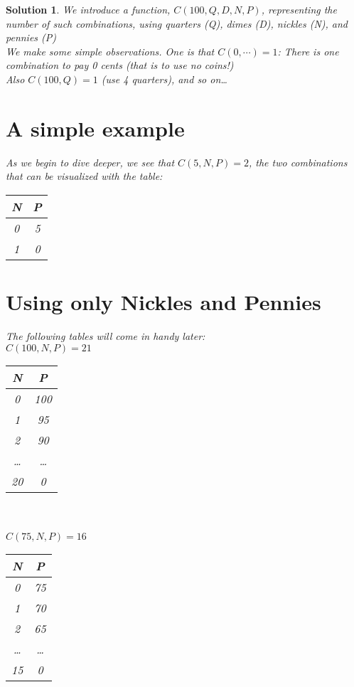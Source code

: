 \documentclass{article}
\newtheorem*{solution*}{Solution}
\begin{document}
\begin{solution*}
We introduce a function, $C(100, Q, D, N, P)$,
representing the number of such combinations,
using quarters (Q), dimes (D), nickles (N), and pennies (P)\\

We make some simple observations. One is that $C(0,\cdots)=1$: 
There is one combination to pay 0 cents (that is to use no coins!)\\

Also $C(100,Q)=1$ (use 4 quarters), and so on\dots\\

\section{A simple example}
As we begin to dive deeper, we see that $C(5, N, P)=2$, the
two combinations that can be visualized with the table:\\

\begin{tabular}{|c|c|}
    \hline
    N & P \\
    \hline
    0 & 5\\
    \hline
    1 & 0\\
    \hline
\end{tabular}

\newpage
\section{Using only Nickles and Pennies}
The following tables will come in handy later:\\

$C(100, N, P)=21$\\
\begin{tabular}{|c|c|}
    \hline
    N & P \\
    \hline
    0 & 100\\
    \hline
    1 & 95\\
    \hline
    2 & 90\\
    \hline
    \dots & \dots\\
    \hline
    20 & 0\\
    \hline
\end{tabular}\\\\

$C(75, N, P)=16$\\
\begin{tabular}{|c|c|}
    \hline
    N & P \\
    \hline
    0 & 75\\
    \hline
    1 & 70\\
    \hline
    2 & 65\\
    \hline
    \dots & \dots\\
    \hline
    15 & 0\\
    \hline
\end{tabular}\\\\  


\end{solution*}
\end{document}

